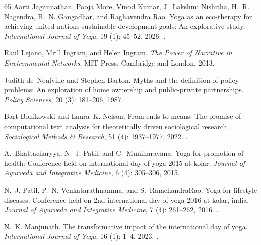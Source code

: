 \documentclass[11pt]{article}
\begin{document}
\begin{thebibliography}{65}
Aarti Jagannathan, Pooja More, Vinod Kumar, J.~Lakshmi Nishitha, H.~R.
  Nagendra, B.~N. Gangadhar, and Raghavendra Rao.
\newblock Yoga as an eco-therapy for achieving united nations sustainable
  development goals: An explorative study.
\newblock \emph{International Journal of Yoga}, 19 (1):
  45--52, 2026.
\newblock {}.

Raul Lejano, Mrill Ingram, and Helen Ingram.
\newblock \emph{The Power of Narrative in Environmental Networks}.
\newblock MIT Press, Cambridge and London, 2013.

Judith de~Neufville and Stephen Barton.
\newblock Myths and the definition of policy problems: An exploration of home
  ownership and public-private partnerships.
\newblock \emph{Policy Sciences}, 20 (3): 181--206, 1987.

Bart Bonikowski and Laura~K. Nelson.
\newblock From ends to means: The promise of computational text analysis for
  theoretically driven sociological research.
\newblock \emph{Sociological Methods \& Research}, 51 (4):
  1937--1977, 2022.
\newblock {}.

A.~Bhattacharyya, N.~J. Patil, and C.~Muninarayana.
\newblock Yoga for promotion of health: Conference held on international day of
  yoga 2015 at kolar.
\newblock \emph{Journal of Ayurveda and Integrative Medicine}, 6
  (4): 305--306, 2015.
\newblock {}.

N.~J. Patil, P.~N. Venkatarathnamma, and S.~RamchandraRao.
\newblock Yoga for lifestyle diseases: Conference held on 2nd international day
  of yoga 2016 at kolar, india.
\newblock \emph{Journal of Ayurveda and Integrative Medicine}, 7
  (4): 261--262, 2016.
\newblock {}.

N.~K. Manjunath.
\newblock The transformative impact of the international day of yoga.
\newblock \emph{International Journal of Yoga}, 16 (1): 1--4,
  2023.
\newblock {}.


\end{thebibliography}
\end{document}
